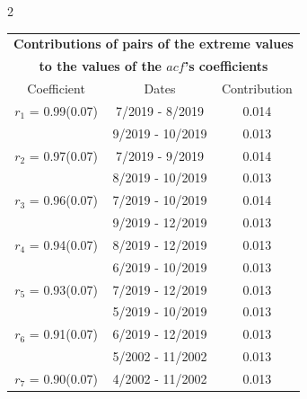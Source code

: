 
\thispagestyle{empty}
\begin{multicols}{2}{ 
\begin{tabular}{ccc}
\multicolumn{3}{c}{\textbf{Contributions of pairs of the extreme values} }  \vspace{-.10in}  \\ 
\multicolumn{3}{c}{ \textbf{to the values of the $acf$'s coefficients}} \\ 
\hline 
\hline                  Coefficient  &  Dates &  Contribution \\ 
\hline 
  $r_{ 1}$ = 0.99(0.07) &       7/2019 -  8/2019 &        0.014   \vspace{-.10in} \\  
&        9/2019 - 10/2019 &        0.013  \vspace{-.02in} \\ \hline 
  $r_{ 2}$ = 0.97(0.07) &       7/2019 -  9/2019 &        0.014   \vspace{-.10in} \\  
&        8/2019 - 10/2019 &        0.013  \vspace{-.02in} \\ \hline 
  $r_{ 3}$ = 0.96(0.07) &       7/2019 - 10/2019 &        0.014   \vspace{-.10in} \\  
&        9/2019 - 12/2019 &        0.013  \vspace{-.02in} \\ \hline 
  $r_{ 4}$ = 0.94(0.07) &       8/2019 - 12/2019 &        0.013   \vspace{-.10in} \\  
&        6/2019 - 10/2019 &        0.013  \vspace{-.02in} \\ \hline 
  $r_{ 5}$ = 0.93(0.07) &       7/2019 - 12/2019 &        0.013   \vspace{-.10in} \\  
&        5/2019 - 10/2019 &        0.013  \vspace{-.02in} \\ \hline 
  $r_{ 6}$ = 0.91(0.07) &       6/2019 - 12/2019 &        0.013   \vspace{-.10in} \\  
&        5/2002 - 11/2002 &        0.013  \vspace{-.02in} \\ \hline 
  $r_{ 7}$ = 0.90(0.07) &       4/2002 - 11/2002 &        0.013   \vspace{-.10in} \\  

\end{tabular}}
\end{multicols}
